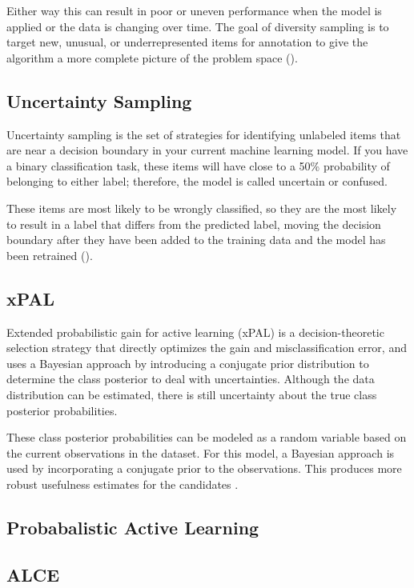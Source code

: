 Either way this can result in poor or uneven performance when the model is applied or the data is changing over time. The goal of diversity sampling is to target new, unusual, or underrepresented items for annotation to give the algorithm a more complete picture of the problem space (\cite{munro2021human}). 

\subsection{Uncertainty Sampling}
Uncertainty sampling is the set of strategies for identifying unlabeled items that are near a decision boundary in your current machine learning model. If you have a binary classification task, these items will have close to a 50\% probability of belonging to either label; therefore, the model is called uncertain or confused. 

These items are most likely to be wrongly classified, so they are the most likely to result in a label that differs from the predicted label, moving the decision boundary after they have been added to the training data and the model has been retrained (\cite{munro2021human}).

\subsection{xPAL}
Extended probabilistic gain for active learning (xPAL) is a decision-theoretic selection strategy that directly optimizes the gain and misclassification error, and uses a Bayesian approach by introducing a conjugate prior distribution to determine the class posterior to deal with uncertainties. Although the data distribution can be estimated, there is still uncertainty about the true class posterior probabilities. 

These class posterior probabilities can be modeled as a random variable based on the current observations in the dataset. For this model, a Bayesian approach is used by incorporating a conjugate prior to the observations. This produces more robust usefulness estimates for the candidates \cite{kottke2021toward}.

\subsection{Probabalistic Active Learning}

\subsection{ALCE}

